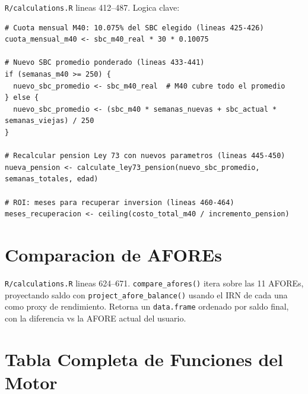 \documentclass[11pt, letterpaper, twoside]{report}
\begin{document}
\begin{codigobox}
\texttt{R/calculations.R} lineas 412--487. Logica clave:
\begin{lstlisting}[caption={Modalidad 40 con promedio ponderado}]
# Cuota mensual M40: 10.075% del SBC elegido (lineas 425-426)
cuota_mensual_m40 <- sbc_m40_real * 30 * 0.10075

# Nuevo SBC promedio ponderado (lineas 433-441)
if (semanas_m40 >= 250) {
  nuevo_sbc_promedio <- sbc_m40_real  # M40 cubre todo el promedio
} else {
  nuevo_sbc_promedio <- (sbc_m40 * semanas_nuevas + sbc_actual * semanas_viejas) / 250
}

# Recalcular pension Ley 73 con nuevos parametros (lineas 445-450)
nueva_pension <- calculate_ley73_pension(nuevo_sbc_promedio, semanas_totales, edad)

# ROI: meses para recuperar inversion (lineas 460-464)
meses_recuperacion <- ceiling(costo_total_m40 / incremento_pension)
\end{lstlisting}
\end{codigobox}


\section{Comparacion de AFOREs}

\begin{codigobox}
\texttt{R/calculations.R} lineas 624--671. \texttt{compare\_afores()} itera sobre las
11 AFOREs, proyectando saldo con \texttt{project\_afore\_balance()} usando el IRN
de cada una como proxy de rendimiento. Retorna un \texttt{data.frame} ordenado
por saldo final, con la diferencia vs la AFORE actual del usuario.
\end{codigobox}


\section{Tabla Completa de Funciones del Motor}
\end{document}

